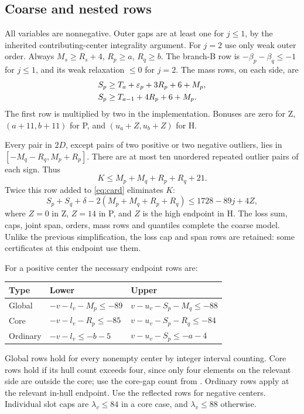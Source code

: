 \documentclass[11pt,a4paper]{article}
\begin{document}
\subsection{Coarse and nested rows}
All variables are nonnegative. Outer gaps are at least one for $j\le1$,
by the inherited contributing-center integrality argument. For $j=2$
use only weak outer order. Always $M_s\ge R_s+4$, $R_p\ge a$, $R_q\ge b$.
The branch-B row is $-\beta_p-\beta_q\le-1$ for $j\le1$, and its weak
relaxation $\le0$ for $j=2$.
The mass rows, on each side, are
\begin{align}
 S_p&\ge T_a+\varepsilon_p+3R_p+6+M_p,\notag\\
 S_p&\ge T_{a-1}+4R_p+6+M_p.\label{eq:mass}
\end{align}
The first row is multiplied by two in the implementation.
Bonuses are zero for Z, $(a+11,b+11)$ for P, and $(u_a+Z,u_b+Z)$ for H.

Every pair in $2D$, except pairs of two positive or two negative
outliers, lies in $[-M_q-R_q,M_p+R_p]$. There are at most ten unordered
repeated outlier pairs of each sign. Thus
\begin{equation}\label{eq:coarse}
 K\le M_p+M_q+R_p+R_q+21.
\end{equation}
Twice this row added to \eqref{eq:card} eliminates $K$:
\begin{equation}\label{eq:spine}
 S_p+S_q+\delta-2(M_p+M_q+R_p+R_q)
 \le1728-89j+4Z,
\end{equation}
where $Z=0$ in Z, $Z=14$ in P, and $Z$ is the high endpoint in H.
The loss sum, caps, joint span, orders, mass rows and quantiles complete
the coarse model. Unlike the previous simplification, the loss cap and
span rows are retained: some certificates at this endpoint use them.

For a positive center the necessary endpoint rows are:
\begin{center}\small
\begin{tabular}{lll}
\toprule
Type&Lower&Upper\\
\midrule
Global&$-v-l_v-M_p\le-89$&$v-u_v-S_p-M_q\le-88$\\
Core&$-v-l_v-R_p\le-85$&$v-u_v-S_p-R_q\le-84$\\
Ordinary&$-v-l_v\le-b-5$&$v-u_v-S_p\le-a-4$\\
\bottomrule
\end{tabular}
\end{center}
Global rows hold for every nonempty center by integer interval counting.
Core rows hold if its hull count exceeds four, since only four elements
on the relevant side are outside the core; use the core-gap count from
\cite{previous}. Ordinary rows apply at the relevant in-hull endpoint.
Use the reflected rows for negative centers. Individual slot caps are
$\lambda_v\le84$ in a core case, and $\lambda_v\le88$ otherwise.
\end{document}
